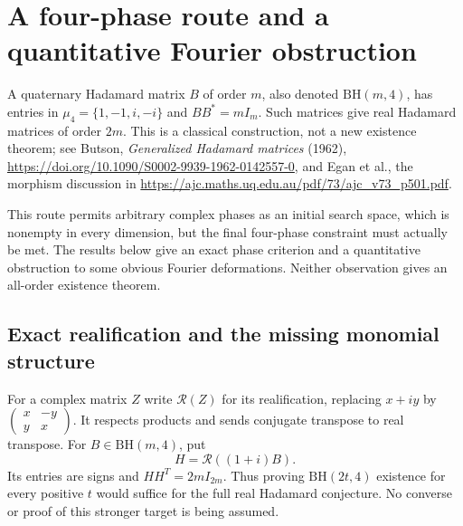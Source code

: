 \section{A four-phase route and a quantitative Fourier obstruction}
\label{sec:four-phase-route}

A quaternary Hadamard matrix $B$ of order $m$, also denoted
$\mathrm{BH}(m,4)$, has entries in $\mu_4=\{1,-1,i,-i\}$ and
$BB^*=mI_m$. Such matrices give real Hadamard matrices of order
$2m$. This is a classical construction, not a new existence theorem;
see Butson, \emph{Generalized Hadamard matrices} (1962),
\url{https://doi.org/10.1090/S0002-9939-1962-0142557-0},
and Egan et al., the morphism discussion in
\url{https://ajc.maths.uq.edu.au/pdf/73/ajc_v73_p501.pdf}.

This route permits arbitrary complex phases as an initial search
space, which is nonempty in every dimension, but the final four-phase
constraint must actually be met. The results below give an exact
phase criterion and a quantitative obstruction to some obvious
Fourier deformations. Neither observation gives an all-order existence theorem.

\subsection{Exact realification and the missing monomial structure}
For a complex matrix $Z$ write $\mathcal R(Z)$ for its realification,
replacing $x+iy$ by $\left(\begin{smallmatrix}x&-y\\y&x\end{smallmatrix}\right)$.
It respects products and sends conjugate transpose to real transpose.
For $B\in\mathrm{BH}(m,4)$, put
\[
                   H=\mathcal R((1+i)B).
\]
Its entries are signs and $HH^T=2mI_{2m}$. Thus proving
$\mathrm{BH}(2t,4)$ existence for every positive $t$ would suffice
for the full real Hadamard conjecture. No converse or proof of this
stronger target is being assumed.

